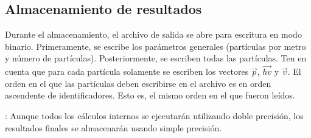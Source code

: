 \subsection{Almacenamiento de resultados}

Durante el almacenamiento, el archivo de salida se abre para escritura
en modo binario. Primeramente, se escribe los parámetros generales (partículas
por metro y número de partículas). Posteriormente, se escriben todas las
partículas. Ten en cuenta que para cada partícula solamente se escriben los vectores
$\vec{p}$, $\overrightarrow{hv}$ y $\vec{v}$. El orden en el que las partículas
deben escribirse en el archivo es en orden ascendente de identificadores.
Esto es, el mismo orden en el que fueron leídos.

: 
Aunque todos los cálculos internos se ejecutarán utilizando doble precisión,
los resultados finales se almacenarán usando simple precisión.
